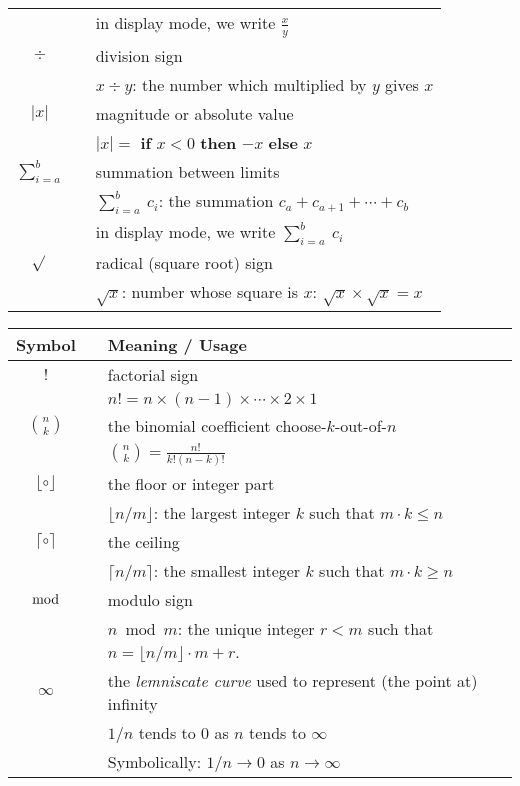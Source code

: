 \begin{tabular}{c|cl}
  & & in display mode, we write $\displaystyle \frac{x}{y}$ \\
$\div$
  & & division sign \\
  & & $x \div y$: the number which multiplied by $y$ gives $x$ \\ \hline
$|x|$
  & & magnitude or absolute value \\
  & & $|x| =$ {\bf if} $x<0$ {\bf then} $-x$ {\bf else} $x$ \\ \hline
$\displaystyle \sum_{i=a}^b$
  & & summation between limits \\
  & & $\sum_{i=a}^b \ c_i$: the summation $c_a + c_{a+1} + \cdots + c_b$ \\
  & & in display mode, we write $\displaystyle \sum_{i=a}^b \ c_i$  \\ \hline
$\sqrt{}$
  & & radical (square root) sign \\
  & & $\sqrt{x}$: number whose square is $x$: $\sqrt{x} \times \sqrt{x} = x$ \\ \hline
\end{tabular}

\begin{tabular}{c|cl}
{\bf Symbol} & & {\bf Meaning} / {\bf Usage} \\ \hline
\hline
$!$
  & & factorial sign \\
  & & $n! = n \times (n-1) \times \cdots \times 2 \times 1$ \\ \hline
$\displaystyle {n \choose k}$ 
  & & the binomial coefficient choose-$k$-out-of-$n$ \\
  & & $\displaystyle {n \choose k} = \frac{n!}{k! (n-k)!}$ \\ \hline
$\lfloor \circ \rfloor$
  & & the floor or integer part \\
  & & $\lfloor n/m \rfloor$: the largest integer $k$ such that $m \cdot k \leq n$ \\ \hline
$\lceil \circ \rceil$
  & & the ceiling \\
  & & $\lceil n/m \rceil$: the smallest integer $k$ such that $m \cdot k \geq n$ \\ \hline
$\bmod$
  & & modulo sign\\
  & & $n \bmod m$: the unique integer $r < m$ such that $n =  \lfloor n/m \rfloor \cdot m + r$. \\ \hline
$\infty$
  & & the {\it lemniscate curve} used to represent (the point at) infinity \\
  & & $1/n$ tends to $0$ as $n$ tends to $\infty$ \\
  & & Symbolically: $1/n \rightarrow 0$ as $n \rightarrow \infty$ \\ \hline
\end{tabular}

